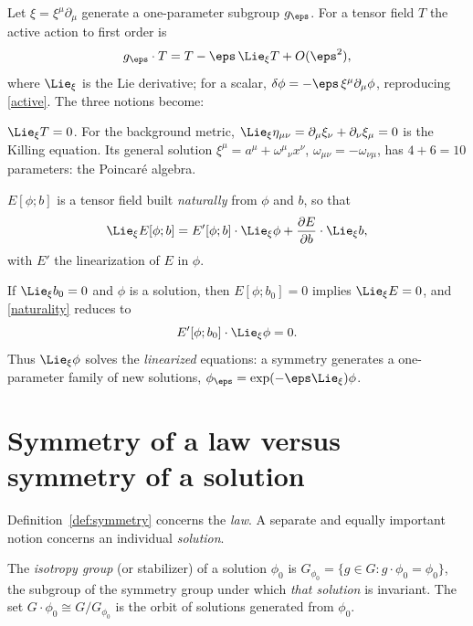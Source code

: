 Let $\xi=\xi^\mu\partial_\mu$ generate a one-parameter subgroup $g_\eps$.
For a tensor field $T$ the active action to first order is
\begin{equation}\label{lie}
  g_\eps\cdot T = T-\eps\,\Lie_\xi T+O(\eps^2),
\end{equation}
where $\Lie_\xi$ is the Lie derivative; for a scalar,
$\delta\phi=-\eps\,\xi^\mu\partial_\mu\phi$, reproducing
\eqref{active}. The three notions become:
\begin{description}[leftmargin=1.2em,itemsep=3pt]
\item[Invariance of an object] $\Lie_\xi T=0$. For the background metric,
  $\Lie_\xi\eta_{\mu\nu}=\partial_\mu\xi_\nu+\partial_\nu\xi_\mu=0$ is the
  Killing equation. Its general solution
  $\xi^\mu=a^\mu+\omega^\mu{}_{\nu}x^\nu$, $\omega_{\mu\nu}=-\omega_{\nu\mu}$,
  has $4+6=10$ parameters: the Poincar\'e algebra.
\item[Covariance of an equation] $E[\phi;b]$ is a tensor field built
  \emph{naturally} from $\phi$ and $b$, so that
  \begin{equation}\label{naturality}
    \Lie_\xi E[\phi;b]=E'[\phi;b]\cdot\Lie_\xi\phi+\frac{\partial E}{\partial b}\cdot\Lie_\xi b,
  \end{equation}
  with $E'$ the linearization of $E$ in $\phi$.
\item[Symmetry] If $\Lie_\xi b_0=0$ and $\phi$ is a solution, then
  $E[\phi;b_0]=0$ implies $\Lie_\xi E=0$, and \eqref{naturality} reduces to
  \begin{equation}\label{zero-mode}
    E'[\phi;b_0]\cdot\Lie_\xi\phi=0.
  \end{equation}
  Thus $\Lie_\xi\phi$ solves the \emph{linearized} equations: a symmetry
  generates a one-parameter family of new solutions, $\phi_\eps=\exp(-\eps\Lie_\xi)\phi$.
\end{description}

\section{Symmetry of a law versus symmetry of a solution}
\label{sec:law-solution}

Definition~\ref{def:symmetry} concerns the \emph{law}. A separate and equally
important notion concerns an individual \emph{solution}.

\begin{definition}\label{def:isotropy}
The \emph{isotropy group} (or stabilizer) of a solution $\phi_0$ is
$G_{\phi_0}=\{g\in G: g\cdot\phi_0=\phi_0\}$, the subgroup of the symmetry group
under which \emph{that solution} is invariant. The set $G\cdot\phi_0
\cong G/G_{\phi_0}$ is the orbit of solutions generated from $\phi_0$.
\end{definition}

